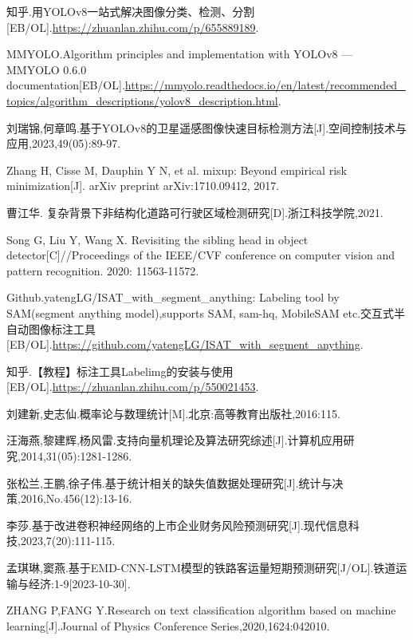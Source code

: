 \documentclass{MathorCupmodeling}
\begin{document}
	\begin{spacing}{1.08}
	\begin{thebibliography}{99}
	知乎.用YOLOv8一站式解决图像分类、检测、分割[EB/OL].\url{https://zhuanlan.zhihu.com/p/655889189}.

	MMYOLO.Algorithm principles and implementation with YOLOv8 — MMYOLO 0.6.0 documentation[EB/OL].\url{https://mmyolo.readthedocs.io/en/latest/recommended_topics/algorithm_descriptions/yolov8_description.html}.

	刘瑞锦,何章鸣.基于YOLOv8的卫星遥感图像快速目标检测方法[J].空间控制技术与应用,2023,49(05):89-97.

	Zhang H, Cisse M, Dauphin Y N, et al. mixup: Beyond empirical risk minimization[J]. arXiv preprint arXiv:1710.09412, 2017.

	曹江华. 复杂背景下非结构化道路可行驶区域检测研究[D].浙江科技学院,2021.

	Song G, Liu Y, Wang X. Revisiting the sibling head in object detector[C]//Proceedings of the IEEE/CVF conference on computer vision and pattern recognition. 2020: 11563-11572.

	Github.yatengLG/ISAT\_with\_segment\_anything: Labeling tool by SAM(segment anything model),supports SAM, sam-hq, MobileSAM etc.交互式半自动图像标注工具[EB/OL].\url{https://github.com/yatengLG/ISAT_with_segment_anything}.

	知乎.【教程】标注工具Labelimg的安装与使用[EB/OL].\url{https://zhuanlan.zhihu.com/p/550021453}.


	刘建新,史志仙.概率论与数理统计[M].北京:高等教育出版社,2016:115.

	汪海燕,黎建辉,杨风雷.支持向量机理论及算法研究综述[J].计算机应用研究,2014,31(05):1281-1286.

	张松兰,王鹏,徐子伟.基于统计相关的缺失值数据处理研究[J].统计与决策,2016,No.456(12):13-16.

	李莎.基于改进卷积神经网络的上市企业财务风险预测研究[J].现代信息科技,2023,7(20):111-115.

	孟琪琳,窦燕.基于EMD-CNN-LSTM模型的铁路客运量短期预测研究[J/OL].铁道运输与经济:1-9[2023-10-30].

	ZHANG P,FANG Y.Research on text classification algorithm based on machine learning[J].Journal of Physics Conference Series,2020,1624:042010.


\end{thebibliography}
\end{spacing}
\end{document}
